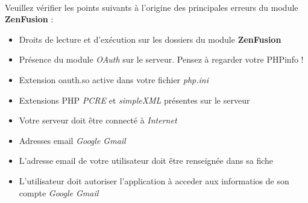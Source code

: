 \documentclass[12pt,a4paper,titlepage]{article}
\begin{document}
		\paragraph{}
		Veuillez vérifier les points suivants à l'origine des principales erreurs du module \textbf{ZenFusion} :
		 \begin{itemize}
		 \item Droits de lecture et d'exécution sur les dossiers du module \textbf{ZenFusion} 
		 \item Présence du module \emph{OAuth} sur le serveur. Pensez à regarder votre PHPinfo !
		 \item Extension oauth.so active dans votre fichier \emph{php.ini}
		 \item Extensions PHP \emph{PCRE} et \emph{simpleXML} présentes sur le serveur
		 \item Votre serveur doit être connecté à \emph{Internet} 
		 \item Adresses email \emph{Google Gmail}
		 \item L'adresse email de votre utilisateur doit être renseignée dans sa fiche
		 \item L'utilisateur doit autoriser l'application à acceder aux informatios de son compte \emph{Google Gmail}
		\end{itemize}
\end{document}
